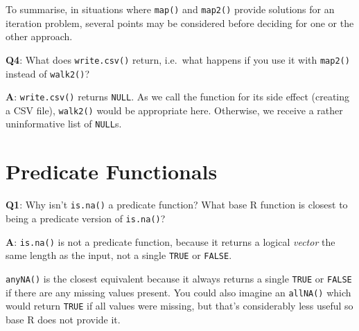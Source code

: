 \documentclass[
]{krantz}
\makeatletter
\newenvironment{Shaded}{\begin{snugshade}}{\end{snugshade}}
\newcommand{\CommentTok}[1]{\textcolor[rgb]{0.56,0.35,0.01}{\textit{#1}}}
\newcommand{\KeywordTok}[1]{\textcolor[rgb]{0.13,0.29,0.53}{\textbf{#1}}}
\newcommand{\NormalTok}[1]{#1}
\newcommand{\OperatorTok}[1]{\textcolor[rgb]{0.81,0.36,0.00}{\textbf{#1}}}
\newcommand{\StringTok}[1]{\textcolor[rgb]{0.31,0.60,0.02}{#1}}
\newenvironment{kframe}{%
\medskip{}
\setlength{\fboxsep}{.8em}
 \def\at@end@of@kframe{}%
 \ifinner\ifhmode%
  \def\at@end@of@kframe{\end{minipage}}%
  \begin{minipage}{\columnwidth}%
 \fi\fi%
 \def\FrameCommand##1{\hskip\@totalleftmargin \hskip-\fboxsep
 \colorbox{shadecolor}{##1}\hskip-\fboxsep
     \hskip-\linewidth \hskip-\@totalleftmargin \hskip\columnwidth}%
 \MakeFramed {\advance\hsize-\width
   \@totalleftmargin\z@ \linewidth\hsize
   \@setminipage}}%
 {\par\unskip\endMakeFramed%
 \at@end@of@kframe}
\renewenvironment{Shaded}{\begin{kframe}}{\end{kframe}}
\renewcommand{\KeywordTok} [1]{\textcolor[rgb]{0.00,0.44,0.13}{{#1}}}
\renewcommand{\StringTok}  [1]{\textcolor[rgb]{0.25,0.44,0.63}{{#1}}}
\renewcommand{\CommentTok} [1]{\textcolor[rgb]{0.38,0.63,0.69}{{#1}}}
\renewcommand{\NormalTok}  [1]{{#1}}
\makeatother
\begin{document}
To summarise, in situations where \texttt{map()} and \texttt{map2()} provide solutions for an iteration problem, several points may be considered before deciding for one or the other approach.

\textbf{{Q4}}: What does \texttt{write.csv()} return, i.e.~what happens if you use it with \texttt{map2()} instead of \texttt{walk2()}?

\textbf{{A}}: \texttt{write.csv()} returns \texttt{NULL}. As we call the function for its side effect (creating a CSV file), \texttt{walk2()} would be appropriate here. Otherwise, we receive a rather uninformative list of \texttt{NULL}s.

\begin{Shaded}
\end{Shaded}


\hypertarget{predicate-functionals}{%
\section{Predicate Functionals}\label{predicate-functionals}}

\textbf{{Q1}}: Why isn't \texttt{is.na()} a predicate function? What base R function is closest to being a predicate version of \texttt{is.na()}?

\textbf{{A}}: \texttt{is.na()} is not a predicate function, because it returns a logical \emph{vector} the same length as the input, not a single \texttt{TRUE} or \texttt{FALSE}.

\texttt{anyNA()} is the closest equivalent because it always returns a single \texttt{TRUE} or \texttt{FALSE} if there are any missing values present. You could also imagine an \texttt{allNA()} which would return \texttt{TRUE} if all values were missing, but that's considerably less useful so base R does not provide it.
\end{document}
